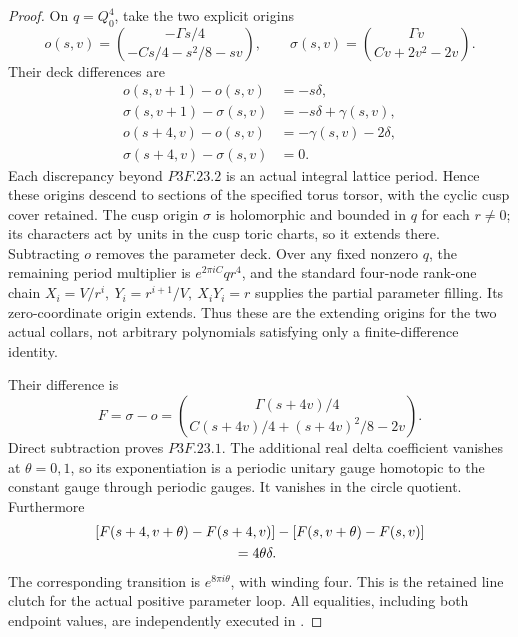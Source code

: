 \begin{proof}
On \(q=Q_0^4\), take the two explicit origins \[
 o(s,v)=\binom{-\Gamma s/4}{-Cs/4-s^2/8-sv},\qquad
 \sigma(s,v)=\binom{\Gamma v}{Cv+2v^2-2v}.          \tag{P3F.23.3}
\] Their deck differences are \[
 \begin{aligned}
 o(s,v+1)-o(s,v)&=-s\delta,\\
 \sigma(s,v+1)-\sigma(s,v)&=-s\delta+\gamma(s,v),\\
 o(s+4,v)-o(s,v)&=-\gamma(s,v)-2\delta,\\
 \sigma(s+4,v)-\sigma(s,v)&=0.
 \end{aligned}                                   \tag{P3F.23.4}
\] Each discrepancy beyond \(P3F.23.2\) is an actual integral lattice period. Hence these origins descend to sections of the specified torus torsor, with the cyclic cusp cover retained. The cusp origin \(\sigma\) is holomorphic and bounded in \(q\) for each \(r\ne0\); its characters act by units in the cusp toric charts, so it extends there. Subtracting \(o\) removes the parameter deck. Over any fixed nonzero \(q\), the remaining period multiplier is \(e^{2\pi iC}q r^4\), and the standard four-node rank-one chain \(X_i=V/r^i,\ Y_i=r^{i+1}/V,\ X_iY_i=r\) supplies the partial parameter filling. Its zero-coordinate origin extends. Thus these are the extending origins for the two actual collars, not arbitrary polynomials satisfying only a finite-difference identity.

Their difference is \[
 F=\sigma-o=
 \binom{\Gamma(s+4v)/4}
       {C(s+4v)/4+(s+4v)^2/8-2v}.
\] Direct subtraction proves \(P3F.23.1\). The additional real delta coefficient vanishes at \(\theta=0,1\), so its exponentiation is a periodic unitary gauge homotopic to the constant gauge through periodic gauges. It vanishes in the circle quotient. Furthermore \[
 \begin{split}
 &[F(s+4,v+\theta)-F(s+4,v)]
       -[F(s,v+\theta)-F(s,v)]\\
 &\hspace{35mm}=4\theta\delta.
 \end{split}
\] The corresponding transition is \(e^{8\pi i\theta}\), with winding four. This is the retained line clutch for the actual positive parameter loop. All equalities, including both endpoint values, are independently executed in .
\end{proof}
